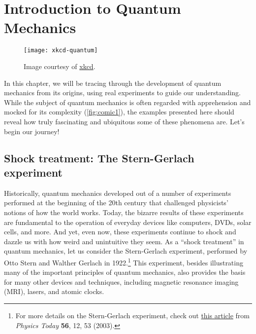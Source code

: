 %

%

\chapter[Introduction]{Introduction to Quantum Mechanics} \label{ch:intro}
\begin{figure}[!h]
	\centering
	\texttt{[image: xkcd-quantum]} \label{fig:xkcd1} 
	\caption{Image courtesy of \href{https://xkcd.com/1240/}{xkcd}.}
	\label{fig:comic1}
\end{figure}

In this chapter, we will be tracing through the development of quantum mechanics from its origins, using real experiments to guide our understanding. 
While the subject of quantum mechanics is often regarded with apprehension and mocked for its complexity (\autoref{fig:comic1}), the examples presented here should reveal how truly fascinating and ubiquitous some of these phenomena are. 
Let's begin our journey!


\section[Shock treatment]{Shock treatment: The Stern-Gerlach experiment}
Historically, quantum mechanics developed out of a number of experiments performed at the beginning of the 20th century that challenged physicists' notions of how the world works. Today, the bizarre results of these experiments are fundamental to the operation of everyday devices like computers, DVDs, solar cells, and more. And yet, even now, these experiments continue to shock and dazzle us with how weird and unintuitive they seem. As a ``shock treatment'' in quantum mechanics, let us consider the Stern-Gerlach experiment, performed by Otto Stern and Walther Gerlach in 1922.\footnote{For more details on the Stern-Gerlach experiment, check out  \href{http://physicstoday.scitation.org/doi/10.1063/1.1650229}{this article} from \emph{Physics Today} \textbf{56}, 12, 53 (2003).} This experiment, besides illustrating many of the important principles of quantum mechanics, also provides the basis for many other devices and techniques, including magnetic resonance imaging (MRI), lasers, and atomic clocks.

